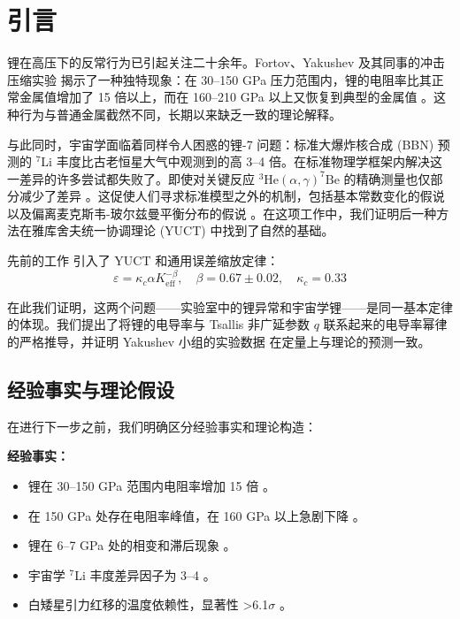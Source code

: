 \documentclass[12pt,a4paper]{article}
\theoremstyle{remark}
\newcommand{\Ke}{K_{\mathrm{eff}}}
\newcommand{\kappac}{\kappa_c}
\newcommand{\alp}{\alpha}
\begin{document}
	\tableofcontents
	\newpage
	
	\section{引言}
	
	锂在高压下的反常行为已引起关注二十余年。Fortov、Yakushev 及其同事的冲击压缩实验 \cite{fortov2001, yakushev2002, fortov1999} 揭示了一种独特现象：在 30–150 GPa 压力范围内，锂的电阻率比其正常金属值增加了 15 倍以上，而在 160–210 GPa 以上又恢复到典型的金属值 \cite{fortov2001, yakushev2002}。这种行为与普通金属截然不同，长期以来缺乏一致的理论解释。
	
	与此同时，宇宙学面临着同样令人困惑的锂-7 问题：标准大爆炸核合成 (BBN) 预测的 \(^7\)Li 丰度比古老恒星大气中观测到的高 3–4 倍。在标准物理学框架内解决这一差异的许多尝试都失败了。即使对关键反应 \(^3\mathrm{He}(\alpha,\gamma)^7\mathrm{Be}\) 的精确测量也仅部分减少了差异 \cite{IAEA2017}。这促使人们寻求标准模型之外的机制，包括基本常数变化的假说 \cite{HAL2006} 以及偏离麦克斯韦-玻尔兹曼平衡分布的假说 \cite{bertulani2015}。在这项工作中，我们证明后一种方法在雅库舍夫统一协调理论 (YUCT) 中找到了自然的基础。
	
	先前的工作 \cite{yuct2026, appendixL, appendixC} 引入了 YUCT 和通用误差缩放定律：
	\begin{equation}
		\varepsilon = \kappac \alp \Ke^{-\beta}, \quad \beta = 0.67 \pm 0.02, \quad \kappac = 0.33
		\label{eq:universal}
	\end{equation}
	
	在此我们证明，这两个问题——实验室中的锂异常和宇宙学锂——是同一基本定律的体现。我们提出了将锂的电导率与 Tsallis 非广延参数 \(q\) 联系起来的电导率幂律的严格推导，并证明 Yakushev 小组的实验数据 \cite{fortov2001, yakushev2002} 在定量上与理论的预测一致。
	
	\subsection{经验事实与理论假设}
	
	在进行下一步之前，我们明确区分经验事实和理论构造：
	
	\textbf{经验事实：}
	\begin{itemize}
		\item 锂在 30–150 GPa 范围内电阻率增加 15 倍 \cite{fortov2001}。
		\item 在 150 GPa 处存在电阻率峰值，在 160 GPa 以上急剧下降 \cite{yakushev2002}。
		\item 锂在 6–7 GPa 处的相变和滞后现象 \cite{orlov2001}。
		\item 宇宙学 \(^7\)Li 丰度差异因子为 3–4 \cite{bertulani2015}。
		\item 白矮星引力红移的温度依赖性，显著性 >6.1\(\sigma\) \cite{Crumpler2024}。
	\end{itemize}
	
\end{document}
